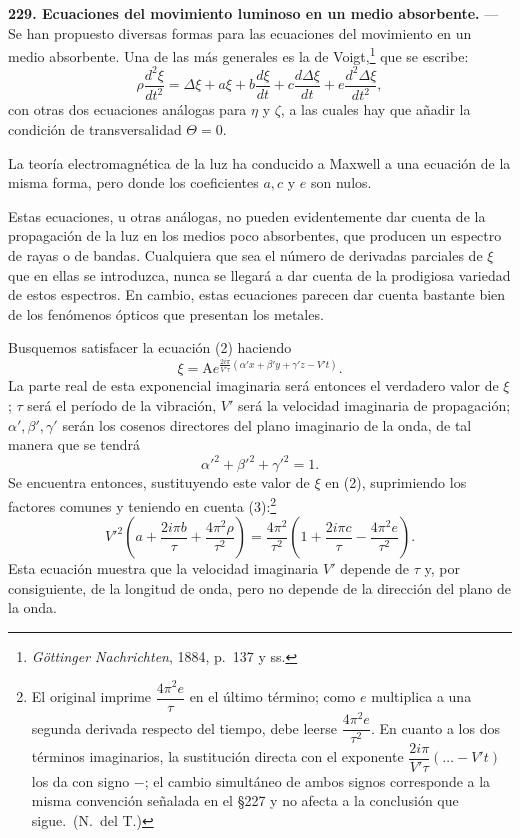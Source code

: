 \noindent\textbf{229. Ecuaciones del movimiento luminoso en un medio
absorbente.} — Se han propuesto diversas formas para las ecuaciones del
movimiento en un medio absorbente. Una de las más generales es la de
Voigt,\footnote{\emph{Göttinger Nachrichten}, 1884, p.~137 y ss.} que se
escribe:
\begin{equation}
\rho\frac{d^2\xi}{dt^2}=\Delta\xi+a\xi+b\frac{d\xi}{dt}+c\frac{d\Delta\xi}{dt}
+e\frac{d^2\Delta\xi}{dt^2},
\end{equation}
con otras dos ecuaciones análogas para $\eta$ y $\zeta$, a las cuales hay
que añadir la condición de transversalidad $\Theta=0$.

La teoría electromagnética de la luz ha conducido a Maxwell a una
ecuación de la misma forma, pero donde los coeficientes $a,c$ y $e$ son
nulos.

Estas ecuaciones, u otras análogas, no pueden evidentemente dar cuenta de
la propagación de la luz en los medios poco absorbentes, que producen un
espectro de rayas o de bandas. Cualquiera que sea el número de derivadas
parciales de $\xi$ que en ellas se introduzca, nunca se llegará a dar
cuenta de la prodigiosa variedad de estos espectros. En cambio, estas
ecuaciones parecen dar cuenta bastante bien de los fenómenos ópticos que
presentan los metales.

Busquemos satisfacer la ecuación (2) haciendo
\[
\xi=\mathrm{A}e^{\frac{2i\pi}{V'\tau}(\alpha'x+\beta'y+\gamma'z-V't)}.
\]
La parte real de esta exponencial imaginaria será entonces el verdadero
valor de $\xi$; $\tau$ será el período de la vibración, $V'$ será la
velocidad imaginaria de propagación; $\alpha',\beta',\gamma'$ serán los
cosenos directores del plano imaginario de la onda, de tal manera que se
tendrá
\begin{equation}
\alpha'^2+\beta'^2+\gamma'^2=1.
\end{equation}
Se encuentra entonces, sustituyendo este valor de $\xi$ en (2),
suprimiendo los factores comunes y teniendo en cuenta
(3):\footnote{El original imprime $\dfrac{4\pi^2e}{\tau}$ en el último
término; como $e$ multiplica a una segunda derivada respecto del tiempo,
debe leerse $\dfrac{4\pi^2e}{\tau^2}$. En cuanto a los dos términos
imaginarios, la sustitución directa con el exponente
$\dfrac{2i\pi}{V'\tau}(\ldots-V't)$ los da con signo $-$; el cambio
simultáneo de ambos signos corresponde a la misma convención señalada en
el §227 y no afecta a la conclusión que sigue.~(N.~del T.)}
\begin{equation}
V'^2\left(a+\frac{2i\pi b}{\tau}+\frac{4\pi^2\rho}{\tau^2}\right)
=\frac{4\pi^2}{\tau^2}\left(1+\frac{2i\pi c}{\tau}-\frac{4\pi^2 e}{\tau^2}\right).
\end{equation}
Esta ecuación muestra que la velocidad imaginaria $V'$ depende de $\tau$
y, por consiguiente, de la longitud de onda, pero no depende de la
dirección del plano de la onda.

